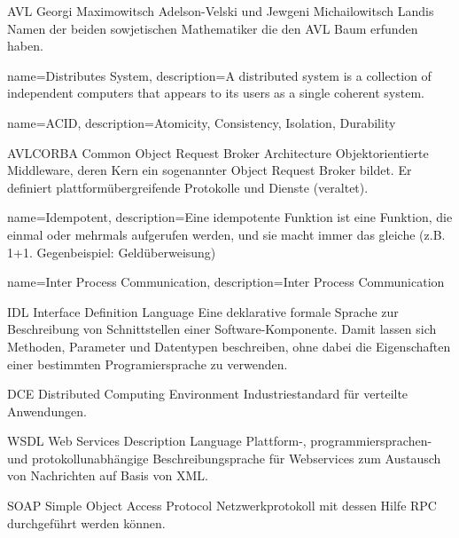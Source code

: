 {AVL}
{Georgi Maximowitsch Adelson-Velski und Jewgeni Michailowitsch Landis}
{
	Namen der beiden sowjetischen Mathematiker die den AVL Baum erfunden haben.
}

{
	name={Distributes System},
	description={A distributed system is a collection of independent computers that appears to its users as a single coherent system.}
}

{
	 name={ACID},
	 description={Atomicity, Consistency, Isolation, Durability}
}

{AVLCORBA}
{Common Object Request Broker Architecture}
{
	Objektorientierte Middleware, deren Kern ein sogenannter Object Request Broker bildet. Er definiert plattformübergreifende Protokolle und Dienste (veraltet).
}

{
	name={Idempotent},
	description={Eine idempotente Funktion ist eine Funktion, die einmal oder mehrmals aufgerufen werden, und sie macht immer das gleiche (z.B. 1+1. Gegenbeispiel: Geldüberweisung)}
}

{
	name={Inter Process Communication},
	description={Inter Process Communication}
}

{IDL}
{Interface Definition Language}
{
	Eine deklarative formale Sprache zur Beschreibung von Schnittstellen einer Software-Komponente. Damit lassen sich Methoden, Parameter und Datentypen beschreiben, ohne dabei die Eigenschaften einer bestimmten Programiersprache zu verwenden.
}

{DCE}
{Distributed Computing Environment}
{
	Industriestandard für verteilte Anwendungen. 
}

{WSDL}
{Web Services Description Language}
{
	Plattform-, programmiersprachen- und protokollunabhängige Beschreibungsprache für Webservices zum Austausch von Nachrichten auf Basis von XML.
}

{SOAP}
{Simple Object Access Protocol}
{
	Netzwerkprotokoll mit dessen Hilfe RPC durchgeführt werden können. 
}
